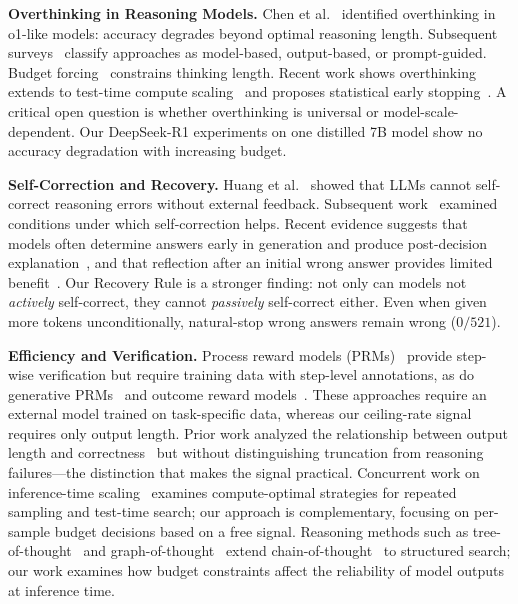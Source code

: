 \documentclass{article}
\begin{document}
\textbf{Overthinking in Reasoning Models.}
Chen et al.~\cite{chen2024overthinking} identified overthinking in o1-like models: accuracy degrades beyond optimal reasoning length. Subsequent surveys~\cite{stoptoverthinking2025survey} classify approaches as model-based, output-based, or prompt-guided. Budget forcing~\cite{muennighoff2025s1} constrains thinking length. Recent work shows overthinking extends to test-time compute scaling~\cite{morethinkinghurts2026} and proposes statistical early stopping~\cite{statstop2026}. A critical open question is whether overthinking is universal or model-scale-dependent. Our DeepSeek-R1 experiments on one distilled 7B model show no accuracy degradation with increasing budget.

\textbf{Self-Correction and Recovery.}
Huang et al.~\cite{huang2023selfcorrect} showed that LLMs cannot self-correct reasoning errors without external feedback. Subsequent work~\cite{tyen2024llms,madaan2023self} examined conditions under which self-correction helps. Recent evidence suggests that models often determine answers early in generation and produce post-decision explanation~\cite{decideearly2026}, and that reflection after an initial wrong answer provides limited benefit~\cite{firsttry2025}. Our Recovery Rule is a stronger finding: not only can models not \emph{actively} self-correct, they cannot \emph{passively} self-correct either. Even when given more tokens unconditionally, natural-stop wrong answers remain wrong ($0/521$).

\textbf{Efficiency and Verification.}
Process reward models (PRMs)~\cite{lightman2023process} provide step-wise verification but require training data with step-level annotations, as do generative PRMs~\cite{genprm2024,zhang2025generative} and outcome reward models~\cite{cobbe2021gsm8k}. These approaches require an external model trained on task-specific data, whereas our ceiling-rate signal requires only output length. Prior work analyzed the relationship between output length and correctness~\cite{concisethoughts2024} but without distinguishing truncation from reasoning failures---the distinction that makes the signal practical. Concurrent work on inference-time scaling~\cite{qiu2024treebon,setlur2025scaling} examines compute-optimal strategies for repeated sampling and test-time search; our approach is complementary, focusing on per-sample budget decisions based on a free signal. Reasoning methods such as tree-of-thought~\cite{yao2024tree} and graph-of-thought~\cite{besta2024graph} extend chain-of-thought~\cite{wei2022chain} to structured search; our work examines how budget constraints affect the reliability of model outputs at inference time.
\end{document}
